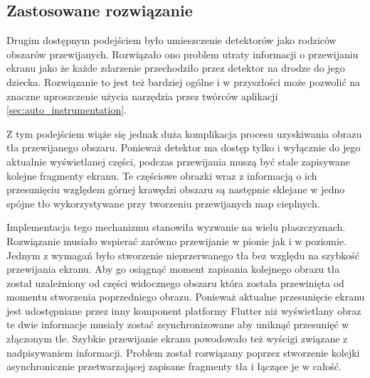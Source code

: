 \subsection{Zastosowane rozwiązanie}
Drugim dostępnym podejściem było umieszczenie detektorów jako rodziców obszarów przewijanych. Rozwiązało ono problem utraty informacji o przewijaniu ekranu jako że każde zdarzenie przechodziło przez detektor na drodze do jego dziecka. Rozwiązanie to jest też bardziej ogólne i w przyszłości może pozwolić na znaczne uproszczenie użycia narzędzia przez twórców aplikacji \ref{sec:auto_instrumentation}. 

Z tym podejściem wiąże się jednak duża komplikacja procesu uzyskiwania obrazu tła przewijanego obszaru. Ponieważ detektor ma dostęp tylko i wyłącznie do jego aktualnie wyświetlanej części, podczas przewijania muszą być stale zapisywane kolejne fragmenty ekranu. Te częściowe obrazki wraz z informacją o ich przesunięciu względem górnej krawędzi obszaru są następnie sklejane w jedno spójne tło wykorzystywane przy tworzeniu przewijanych map cieplnych.

Implementacja tego mechanizmu stanowiła wyzwanie na wielu płaszczyznach. Rozwiązanie musiało wspierać zarówno przewijanie w pionie jak i w poziomie. Jednym z wymagań było stworzenie nieprzerwanego tła bez względu na szybkość przewijania ekranu. Aby go osiągnąć moment zapisania kolejnego obrazu tła został uzależniony od części widocznego obszaru która została przewinięta od momentu stworzenia poprzedniego obrazu. Ponieważ aktualne przesunięcie ekranu jest udostępniane przez inny komponent platformy Flutter niż wyświetlany obraz te dwie informacje musiały zostać zsynchronizowane aby uniknąć przesunięć w złączonym tle. Szybkie przewijanie ekranu powodowało też wyścigi związane z nadpisywaniem informacji. Problem został rozwiązany poprzez stworzenie kolejki asynchronicznie przetwarzającej zapisane fragmenty tła i łączące je w całość.
